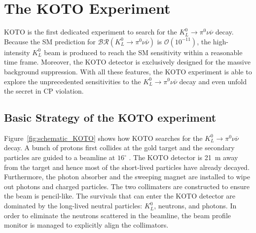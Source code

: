 
\chapter{The KOTO Experiment} %

\label{Chapter3} %


KOTO is the first dedicated experiment to search for the $K_L^0 \to \pi^0 \nu \overline{\nu}$ decay. Because the SM prediction for $\mathcal{BR}(K_L^0 \to \pi^0 \nu \bar{\nu})$ is $\mathcal{O}(10^{-11})$, the high-intensity $K_L^0$ beam is produced to reach the SM sensitivity within a reasonable time frame. Moreover, the KOTO detector is exclusively designed for the massive background suppression. With all these features, the KOTO experiment is able to explore the unprecedented sensitivities to the ${K_L^0 \to \pi^0 \nu \bar{\nu}}$ decay and even unfold the secret in CP violation.



\section{Basic Strategy of the KOTO experiment}
\label{sec:basic}

Figure~\ref{fig:schematic_KOTO} shows how KOTO searches for the ${K_L^0 \to \pi^0 \nu \overline{\nu}}$ decay. A bunch of protons first collides at the gold target and the secondary particles are guided to a beamline at $16^{\circ}$ \parencite{KL_beamline}. The KOTO detector is 21~m away from the target and hence most of the short-lived particles have already decayed. Furthermore, the photon absorber and the sweeping magnet are installed to wipe out photons and charged particles. The two collimaters are constructed to ensure the beam is pencil-like. The survivals that can enter the KOTO detector are dominated by the long-lived neutral particles: $K_L^0$, neutrons, and photons. In order to eliminate the neutrons scattered in the beamline, the beam profile monitor \parencite{BPM} is managed to explicitly align the collimators.

